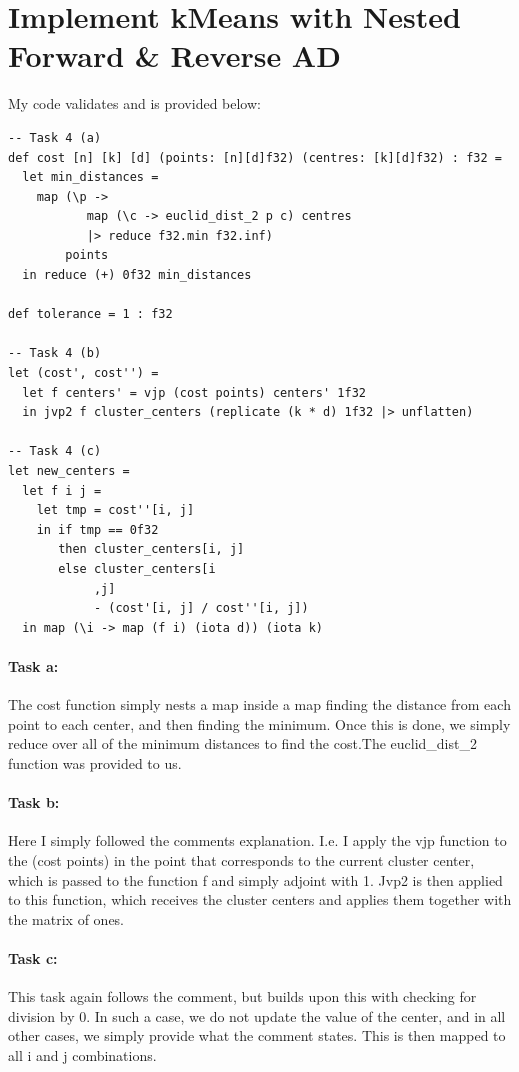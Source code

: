 \section{Implement kMeans with Nested Forward \& Reverse AD}
My code validates and is provided below:
\begin{lstlisting}[language={futhark}]
-- Task 4 (a)
def cost [n] [k] [d] (points: [n][d]f32) (centres: [k][d]f32) : f32 =
  let min_distances =
    map (\p ->
           map (\c -> euclid_dist_2 p c) centres
           |> reduce f32.min f32.inf)
        points
  in reduce (+) 0f32 min_distances

def tolerance = 1 : f32

-- Task 4 (b)
let (cost', cost'') =
  let f centers' = vjp (cost points) centers' 1f32
  in jvp2 f cluster_centers (replicate (k * d) 1f32 |> unflatten)

-- Task 4 (c)
let new_centers =
  let f i j =
    let tmp = cost''[i, j]
    in if tmp == 0f32
       then cluster_centers[i, j]
       else cluster_centers[i
            ,j]
            - (cost'[i, j] / cost''[i, j])
  in map (\i -> map (f i) (iota d)) (iota k)
\end{lstlisting}

\paragraph{Task a:} The cost function simply nests a map inside a map finding the distance from
each point to each center, and then finding the minimum. Once this is done, we
simply reduce over all of the minimum distances to find the cost.The
euclid\_dist\_2 function was provided to us.

\paragraph{Task b:} Here I simply followed the comments explanation. I.e. I
apply the vjp function to the (cost points) in the point that corresponds to
the current cluster center, which is passed to the function f and simply
adjoint with 1. Jvp2 is then applied to this function, which receives the
cluster centers and applies them together with the matrix of ones.

\paragraph{Task c:} This task again follows the comment, but builds upon this
with checking for division by 0. In such a case, we do not update the value of
the center, and in all other cases, we simply provide what the comment states.
This is then mapped to all i and j combinations. 




